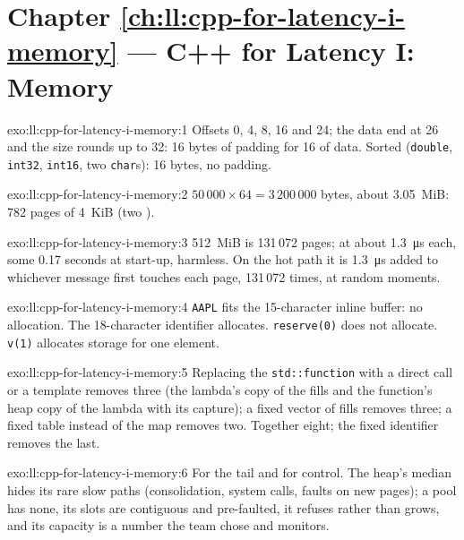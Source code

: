 \section*{Chapter \ref{ch:ll:cpp-for-latency-i-memory} --- C++ for Latency I: Memory}

\begin{solution}{exo:ll:cpp-for-latency-i-memory:1}
Offsets 0, 4, 8, 16 and 24; the data end at 26 and the size rounds up to 32: 16 bytes of padding for 16 of data. Sorted
(\texttt{double}, \texttt{int32}, \texttt{int16}, two \texttt{char}s): 16 bytes, no padding.
\end{solution}

\begin{solution}{exo:ll:cpp-for-latency-i-memory:2}
$50\,000 \times 64 = 3\,200\,000$ bytes, about 3.05~MiB: 782 pages of 4~KiB (two ).
\end{solution}

\begin{solution}{exo:ll:cpp-for-latency-i-memory:3}
512~MiB is 131\,072 pages; at about \qty{1.3}{\micro\second} each, some 0.17 seconds at start-up, harmless. On the hot
path it is \qty{1.3}{\micro\second} added to whichever message first touches each page, 131\,072 times, at random moments.
\end{solution}

\begin{solution}{exo:ll:cpp-for-latency-i-memory:4}
\texttt{\textquotedbl{}AAPL\textquotedbl{}} fits the 15-character inline buffer: no allocation. The 18-character identifier allocates.
\texttt{reserve(0)} does not allocate. \texttt{v(1)} allocates storage for one element.
\end{solution}

\begin{solution}{exo:ll:cpp-for-latency-i-memory:5}
Replacing the \texttt{std::function} with a direct call or a template removes three (the lambda's copy of the fills and
the function's heap copy of the lambda with its capture); a fixed vector of fills removes three; a fixed table instead of
the map removes two. Together eight; the fixed identifier removes the last.
\end{solution}

\begin{solution}{exo:ll:cpp-for-latency-i-memory:6}
For the tail and for control. The heap's median hides its rare slow paths (consolidation, system calls, faults on new
pages); a pool has none, its slots are contiguous and pre-faulted, it refuses rather than grows, and its capacity is a
number the team chose and monitors.
\end{solution}

